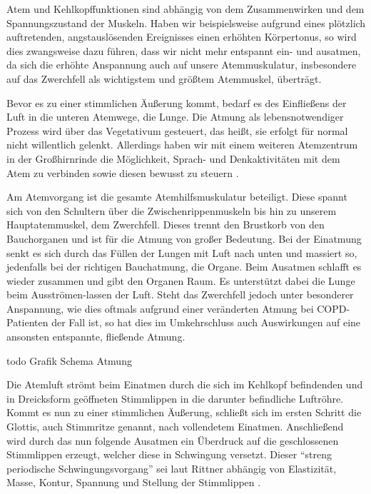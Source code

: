Atem und Kehlkopffunktionen sind abhängig von dem Zusammenwirken und dem Spannungszustand der Muskeln. Haben wir beispielsweise aufgrund eines plötzlich auftretenden, angstauslösenden Ereignisses einen erhöhten Körpertonus, so wird dies zwangsweise dazu führen, dass wir nicht mehr entspannt ein- und ausatmen, da sich die erhöhte Anspannung auch auf unsere Atemmuskulatur, insbesondere auf das Zwerchfell als wichtigstem und größtem Atemmuskel, überträgt. 

Bevor es zu einer stimmlichen Äußerung kommt, bedarf es des Einfließens der Luft in die unteren Atemwege, die Lunge. Die Atmung als lebensnotwendiger Prozess wird über das Vegetativum gesteuert, das heißt, sie erfolgt für normal nicht willentlich gelenkt. Allerdings haben wir mit einem weiteren Atemzentrum in der Großhirnrinde die Möglichkeit, Sprach- und Denkaktivitäten mit dem Atem zu verbinden sowie diesen bewusst zu steuern \autocite[vgl.][2]{ehrmann2004}. 

Am Atemvorgang ist die gesamte Atemhilfsmuskulatur beteiligt. Diese spannt sich von den Schultern über die Zwischenrippenmuskeln bis hin zu unserem Hauptatemmuskel, dem Zwerchfell. Dieses trennt den Brustkorb von den Bauchorganen und ist für die Atmung von großer Bedeutung. Bei der Einatmung senkt es sich durch das Füllen der Lungen mit Luft nach unten und massiert so, jedenfalls bei der richtigen Bauchatmung, die Organe. Beim Ausatmen schlafft es wieder zusammen und gibt den Organen Raum. Es unterstützt dabei die Lunge beim Ausströmen-lassen der Luft. Steht das Zwerchfell jedoch unter besonderer Anspannung, wie dies oftmals aufgrund einer veränderten Atmung bei COPD-Patienten der Fall ist, so hat dies im Umkehrschluss auch Auswirkungen auf eine ansonsten entspannte, fließende Atmung. 

todo Grafik Schema Atmung

Die Atemluft strömt beim Einatmen durch die sich im Kehlkopf befindenden und in Dreicksform geöffneten Stimmlippen in die darunter befindliche Luftröhre. Kommt es nun zu einer stimmlichen Äußerung, schließt sich im ersten Schritt die Glottis, auch Stimmritze genannt, nach vollendetem Einatmen. Anschließend wird durch das nun folgende Ausatmen ein Überdruck auf die geschlossenen Stimmlippen erzeugt, welcher diese in Schwingung versetzt. Dieser "`streng periodische Schwingungsvorgang"' \autocite[481]{rittner2009a} sei laut Rittner abhängig von Elastizität, Masse, Kontur, Spannung und Stellung der Stimmlippen \autocite[vgl.][481]{rittner2009a}.


